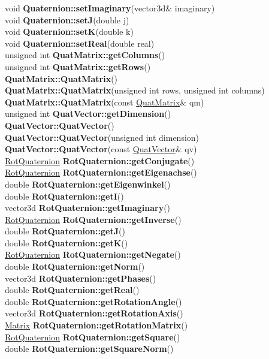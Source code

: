 \documentclass[10pt,titlepage]{article}
\def\functionlistentry#1#2#3#4#5#6{\noindent #1 {\bf #2}(#3) \dotfill #6\\}
\begin{document}
{{\functionlistentry{void}{Quaternion::setImaginary}{vector3d\& imaginary}{1465}{quaternions}{}
\functionlistentry{void}{Quaternion::setJ}{double j}{1463}{quaternions}{}
\functionlistentry{void}{Quaternion::setK}{double k}{1464}{quaternions}{}
\functionlistentry{void}{Quaternion::setReal}{double real}{1461}{quaternions}{}
\functionlistentry{unsigned int}{QuatMatrix::getColumns}{}{1508}{quaternions}{}
\functionlistentry{unsigned int}{QuatMatrix::getRows}{}{1507}{quaternions}{}
\functionlistentry{}{QuatMatrix::QuatMatrix}{}{1504}{quaternions}{}
\functionlistentry{}{QuatMatrix::QuatMatrix}{unsigned int rows, unsigned int columns}{1505}{quaternions}{}
\functionlistentry{}{QuatMatrix::QuatMatrix}{const \hyperlink{QuatMatrix}{QuatMatrix}\& qm}{1506}{quaternions}{}
\functionlistentry{unsigned int}{QuatVector::getDimension}{}{1512}{quaternions}{}
\functionlistentry{}{QuatVector::QuatVector}{}{1509}{quaternions}{}
\functionlistentry{}{QuatVector::QuatVector}{unsigned int dimension}{1510}{quaternions}{}
\functionlistentry{}{QuatVector::QuatVector}{const \hyperlink{QuatVector}{QuatVector}\& qv}{1511}{quaternions}{}
\functionlistentry{\hyperlink{RotQuaternion}{RotQuaternion}}{RotQuaternion::getConjugate}{}{1492}{quaternions}{}
\functionlistentry{\hyperlink{RotQuaternion}{RotQuaternion}}{RotQuaternion::getEigenachse}{}{1498}{quaternions}{}
\functionlistentry{double}{RotQuaternion::getEigenwinkel}{}{1497}{quaternions}{}
\functionlistentry{double}{RotQuaternion::getI}{}{1483}{quaternions}{}
\functionlistentry{vector3d}{RotQuaternion::getImaginary}{}{1486}{quaternions}{}
\functionlistentry{\hyperlink{RotQuaternion}{RotQuaternion}}{RotQuaternion::getInverse}{}{1493}{quaternions}{}
\functionlistentry{double}{RotQuaternion::getJ}{}{1484}{quaternions}{}
\functionlistentry{double}{RotQuaternion::getK}{}{1485}{quaternions}{}
\functionlistentry{\hyperlink{RotQuaternion}{RotQuaternion}}{RotQuaternion::getNegate}{}{1491}{quaternions}{}
\functionlistentry{double}{RotQuaternion::getNorm}{}{1495}{quaternions}{}
\functionlistentry{vector3d}{RotQuaternion::getPhases}{}{1499}{quaternions}{}
\functionlistentry{double}{RotQuaternion::getReal}{}{1482}{quaternions}{}
\functionlistentry{double}{RotQuaternion::getRotationAngle}{}{1487}{quaternions}{}
\functionlistentry{vector3d}{RotQuaternion::getRotationAxis}{}{1488}{quaternions}{}
\functionlistentry{\hyperlink{Matrix}{Matrix}}{RotQuaternion::getRotationMatrix}{}{1500}{quaternions}{}
\functionlistentry{\hyperlink{RotQuaternion}{RotQuaternion}}{RotQuaternion::getSquare}{}{1494}{quaternions}{}
\functionlistentry{double}{RotQuaternion::getSquareNorm}{}{1496}{quaternions}{}
}}
\end{document}
